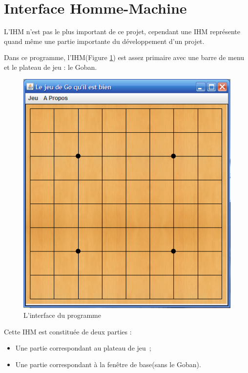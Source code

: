 \documentclass[11pt,a4paper]{article}
\begin{document}
\clearpage		
\section{Interface Homme-Machine}
L'IHM n'est pas le plus important de ce projet, cependant une IHM
représente quand même une partie importante du développement d'un projet.

Dans ce programme, l'IHM(Figure \ref{IHM_Vide}) est assez primaire avec une
barre de menu et le plateau de jeu :  le Goban.\\

	\begin{figure}[!ht]
    	\begin{center}
			\includegraphics[scale=0.5]{IHM_Vide.png}
		\end{center}
	\caption{L'interface du programme}
	\label{IHM_Vide}
	\end{figure}

Cette IHM est constituée de deux parties :

	\begin{itemize}
  		\item Une partie correspondant au plateau de jeu~; 
		\item Une partie correspondant à la fenêtre de base(sans le Goban).\\
    \end{itemize}
    
\end{document}

